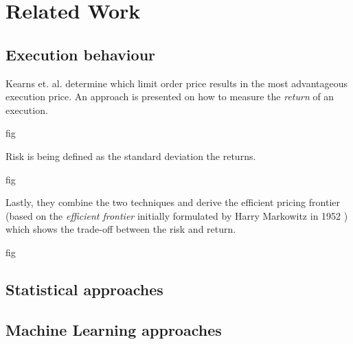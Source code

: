 \chapter{Related Work}
\label{chap:related-work}

\section{Execution behaviour}

Kearns et. al. \cite{nevmyvaka2005electronic} determine which limit order price results in the most advantageous execution price.
An approach is presented on how to measure the \textit{return} of an execution.

fig 

Risk is being defined as the standard deviation the returns. 

fig

Lastly, they combine the two techniques and derive the efficient pricing frontier (based on the \textit{efficient frontier} initially formulated by Harry Markowitz in 1952 \cite{markowitz1952portfolio}) which shows the trade-off between the risk and return.

fig

\section{Statistical approaches}

\section{Machine Learning approaches}